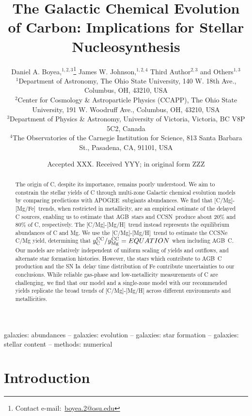 \documentclass[fleqn,
usenatbib]{mnras}
\title[The Origin and Galactic Evolution of Carbon]{The Galactic Chemical Evolution of Carbon: Implications for Stellar Nucleosynthesis }
\author[D. A. Boyea et. al.]{%
Daniel A. Boyea,$^{1, 2, 3}$\thanks{%
Contact e-mail:~\href{mailto:boyea.2@osu.edu}{boyea.2@osu.edu}}
James W. Johnson,$^{1, 2, 4}$
Third Author$^{2,3}$
and Others$^{1,3}$
\\
$^{1}$Department of Astronomy, The Ohio State University, 140 W. 18th Ave., Columbus, OH, 43210, USA
\\
$^{2}$Center for Cosmology \& Astroparticle Physics (CCAPP), The Ohio State University, 191 W. Woodruff Ave., Columbus, OH, 43210, USA
\\
$^{3}$Department of Physics \& Astronomy, University of Victoria, Victoria, BC V8P 5C2, Canada
\\
$^{4}$The Observatories of the Carnegie Institution for Science, 813 Santa Barbara St., Pasadena, CA, 91101, USA
}
\date{Accepted XXX. Received YYY; in original form ZZZ}
\newcommand{\agb}{AGB}
\newcommand{\apogee}{APOGEE}
\newcommand{\cc}{CCSN}
\newcommand{\ia}{SN Ia}
\newcommand{\caah}{[C/Mg]-[Mg/H]}
\newcommand{\caafe}{[C/Mg]-[Mg/Fe]}
\newcommand{\Ycc}{\ensuremath{y_{\rm C}^{\rm CC}}}
\newcommand{\Yoc}{\ensuremath{y_{\rm Mg}^{\rm CC}}}
\begin{document}
\label{firstpage}
\pagerange{\pageref{firstpage}--\pageref{lastpage}}
\maketitle



\begin{abstract}
The origin of C, despite its importance, remains poorly understood. 
% 
We aim to constrain the stellar yields of C through multi-zone Galactic chemical evolution models by comparing predictions with \apogee\ subgiants abundances.
% 
We find that \caafe\ trends, when restricted in metallicity, are an empirical estimate of the delayed C sources, enabling us to estimate that \agb\ stars and \cc\ produce about 20\% and 80\% of C, respectively.  
The \caah\ trend instead represents the equilibrium abundances of C and Mg. 
We use the \caah\ trend to estimate the CCSNe C/Mg yield, determining that  $\Ycc/\Yoc = EQUATION$ when including \agb\ C. 
Our models are relatively independent of uniform scaling of yields and outflows, and alternate star formation histories. 
However, the stars which contribute to \agb\ C production and the \ia\ delay time distribution of Fe contribute uncertainties to our conclusions. 
While reliable gas-phase and low-metallicity measurements of C are challenging, we find that our model and a single-zone model with our recommended yields replicate the broad trends of \caah{} across different environments and metallicities. 

\end{abstract}

\begin{keywords}
galaxies: abundances -- galaxies: evolution -- galaxies: star formation -- galaxies: stellar content -- methods: numerical
\end{keywords}





\section{Introduction}
\end{document}
